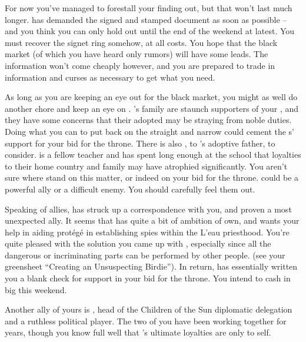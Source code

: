 \documentclass[char]{GL2020}
\begin{document}
For now you've managed to forestall your \cQueen{\parent} finding out, but that won't last much longer. \cQueen{\They} has demanded the signed and stamped document as soon as possible -- and you think you can only hold out until the end of the weekend at latest. You must recover the signet ring somehow, at all costs. You hope that the black market (of which you have heard only rumors) will have some leads. The information won't come cheaply however, and you are prepared to trade in information and curses as necessary to get what you need.

As long as you are keeping an eye out for the black market, you might as well do another chore and keep an eye on \cAdopted{\full}. \cAdopted{}'s family are staunch supporters of your \cQueen{\parent}, and they have some concerns that their adopted \cAdopted{\child} may be straying from \cAdopted{\their} noble duties. Doing what you can to put \cAdopted{\them} back on the straight and narrow could cement the \cAdopted{\formal}s' support for your bid for the throne. There is also \cMusic{\full}, \cMusic{\auncle} to \cAdopted{}'s adoptive father, to consider. \cMusic{} is a fellow teacher and has spent long enough at the school that \cMusic{\their} loyalties to their home country and family may have atrophied significantly. You aren't sure where \cMusic{\they} stand on this matter, or indeed on your bid for the throne. \cMusic{\They} could be a powerful ally or a difficult enemy. You should carefully feel them out.

Speaking of allies, \cAntiChup{\full} has struck up a correspondence with you, and proven a most unexpected ally. It seems that \cAntiChup{} has quite a bit of ambition of \cAntiChup{\their} own, and wants your help in aiding \cAntiChup{\their} protégé in establishing spies within the L'eau priesthood. You're quite pleased with the solution you came up with , especially since all the dangerous or incriminating parts can be performed by other people. (see your greensheet “Creating an Unsuspecting Birdie”).  In return, \cAntiChup{} has essentially written you a blank check for support in your bid for the \pFarm{} throne. You intend to cash in big this weekend. 

Another ally of yours is \cEvil{\full}, head of the Children of the Sun diplomatic delegation and a ruthless political player. The two of you have been working together for years, though you know full well that \cEvil{}'s ultimate loyalties are only to \cEvil{\them}self.  
\end{document}
